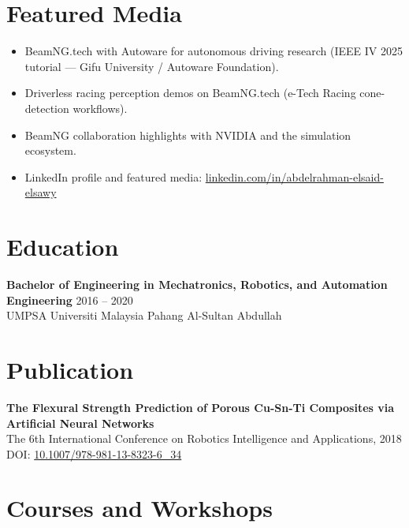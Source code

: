 \documentclass[11pt,a4paper]{article}
\begin{document}
\section*{Featured Media}

\begin{itemize}
    \item BeamNG.tech with Autoware for autonomous driving research (IEEE IV 2025 tutorial — Gifu University / Autoware Foundation).
    \item Driverless racing perception demos on BeamNG.tech (e-Tech Racing cone-detection workflows).
    \item BeamNG collaboration highlights with NVIDIA and the simulation ecosystem.
    \item LinkedIn profile and featured media: \href{https://www.linkedin.com/in/abdelrahman-elsaid-elsawy}{linkedin.com/in/abdelrahman-elsaid-elsawy}
\end{itemize}

\section*{Education}

\textbf{Bachelor of Engineering in Mechatronics, Robotics, and Automation Engineering}
\hfill 2016 -- 2020\\
UMPSA Universiti Malaysia Pahang Al-Sultan Abdullah

\section*{Publication}

\textbf{The Flexural Strength Prediction of Porous Cu-Sn-Ti Composites via Artificial Neural Networks}\\
The 6th International Conference on Robotics Intelligence and Applications, 2018\\
DOI: \href{https://doi.org/10.1007/978-981-13-8323-6_34}{10.1007/978-981-13-8323-6\_34}

\section*{Courses and Workshops}
\end{document}
